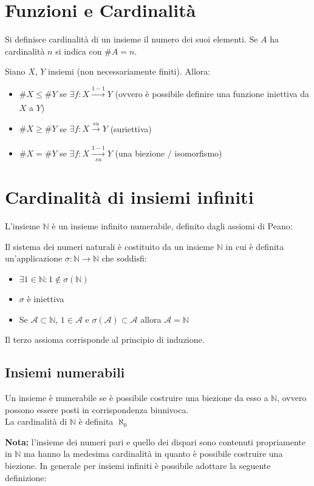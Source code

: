 \documentclass[10pt, oneside]{book}
\theoremstyle{plain}
\begin{document}
\section{Funzioni e Cardinalità}
\begin{defin}
    Si definisce cardinalità di un insieme il numero dei suoi elementi. Se $A$ ha cardinalità $n$ si indica con $\# A = n$.
\end{defin}
\begin{prop}
    Siano $X$, $Y$ insiemi (non necessariamente finiti). Allora:
    \begin{itemize}[label = $\square$]
        \item $\#X \leq \#Y$ se $\exists f : X \xrightarrow[]{1-1} Y$ (ovvero è possibile definire una funzione iniettiva da $X$ a $Y$)
        \item $\#X \geq \#Y$ se $\exists f : X \xrightarrow[]{su} Y$ (suriettiva)
        \item $\#X = \#Y$ se $\exists f : X \xrightarrow[su]{1-1} Y$ (una biezione / isomorfismo)
    \end{itemize}
\end{prop}

\section{Cardinalità di insiemi infiniti}
L'insieme $\mathbb{N}$ è un insieme infinito numerabile, definito dagli assiomi di Peano:
\begin{defin}
    Il sistema dei numeri naturali è costituito da un insieme $\mathbb{N}$ in cui è definita un'applicazione $\sigma : \mathbb{N} \rightarrow \mathbb{N}$ che soddisfi:
    \begin{itemize}
        \item $\exists 1 \in \mathbb{N} : 1 \notin \sigma (\mathbb{N})$
        \item $\sigma$ è iniettiva
        \item Se $\mathcal{A} \subset \mathbb{N}$, $1 \in \mathcal{A}$ e $\sigma(\mathcal{A}) \subset \mathcal{A}$ allora $\mathcal{A} = \mathbb{N}$
    \end{itemize}
    Il terzo assioma corrisponde al principio di induzione.
\end{defin}
\subsection*{Insiemi numerabili}
\begin{defin}
    Un insieme è numerabile se è possibile costruire una biezione da esso a $\mathbb{N}$, ovvero possono essere posti in corrispondenza biunivoca.
    \\La cardinalità di $\mathbb{N}$ è definita $\aleph_0$
\end{defin}
\textbf{Nota: } l'insieme dei numeri pari e quello dei dispari sono contenuti propriamente in $\mathbb{N}$ ma hanno la medesima cardinalità in quanto è possibile costruire una biezione. In generale per insiemi infiniti è possibile adottare la seguente definizione:
\end{document}
